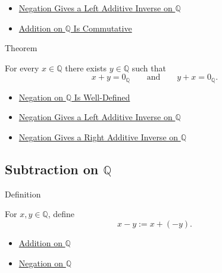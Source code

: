 \begin{dependencies}
\begin{itemize}
  \item \hyperref[thm:negation-left-additive-inverse-on-q]{Negation Gives a Left Additive Inverse on $\mathbb{Q}$}
  \item \hyperref[thm:addition-on-q-commutative]{Addition on $\mathbb{Q}$ Is Commutative}
\end{itemize}
\end{dependencies}

\begin{theorembox}{Theorem}
\begin{theorem}
\label{thm:every-rational-has-additive-inverse}
For every $x\in\mathbb{Q}$ there exists $y\in\mathbb{Q}$ such that
\[
x+y=0_{\mathbb{Q}}
\qquad\text{and}\qquad
y+x=0_{\mathbb{Q}}.
\]
\end{theorem}
\end{theorembox}

\begin{dependencies}
\begin{itemize}
  \item \hyperref[thm:negation-on-q-well-defined]{Negation on $\mathbb{Q}$ Is Well-Defined}
  \item \hyperref[thm:negation-left-additive-inverse-on-q]{Negation Gives a Left Additive Inverse on $\mathbb{Q}$}
  \item \hyperref[cor:negation-right-additive-inverse-on-q]{Negation Gives a Right Additive Inverse on $\mathbb{Q}$}
\end{itemize}
\end{dependencies}

\subsection*{Subtraction on $\mathbb{Q}$}

\begin{definitionbox}{Definition}
\begin{definition}
\label{def:subtraction-on-q}
For $x,y\in\mathbb{Q}$, define
\[
x-y:=x+(-y).
\]
\end{definition}
\end{definitionbox}

\begin{dependencies}
\begin{itemize}
  \item \hyperref[def:addition-on-q-classes]{Addition on $\mathbb{Q}$}
  \item \hyperref[def:negation-on-q-classes]{Negation on $\mathbb{Q}$}
\end{itemize}
\end{dependencies}

